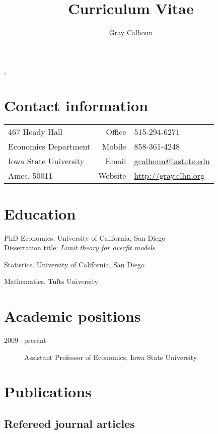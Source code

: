 \documentclass[12pt]{article}%
\author{Gray Calhoun}
\title{Curriculum Vitae}
\makeatletter
\newcommand{\allcaps}[1]{\textls{\MakeUppercase{#1}}}
\def\maketitle{%
\begin{center}%
\par{\textls{\MakeUppercase{\textbf{\@author}}}}%
\vspace{\itemsep}%
\par{\@title, \@date}%
\end{center}%
}
\makeatother
\begin{document}
\maketitle

\section*{Contact information}
\begin{tabular}{@{}lrl@{}}
 467 Heady Hall            & Office  & 515-294-6271              \\
 Economics Department      & Mobile  & 858-361-4248              \\
 Iowa State University     & Email   & \url{gcalhoun@iastate.edu}\\
 Ames, \allcaps{IA} 50011  & Website & \url{http://gray.clhn.org}
\end{tabular}

\section*{Education}

\begin{description}[noitemsep]
\item[2009] PhD Economics. University of California, San Diego \\
Dissertation title: \textit{Limit theory for overfit models}
\item[2006] \allcaps{MS} Statistics. University of California, San Diego
\item[2001] \allcaps{BA} Mathematics. Tufts University
\end{description}

\section*{Academic positions}

\begin{description}
\item[2009\,--\,present] Assistant Professor of Economics, Iowa State University
\end{description}

\section*{Publications}
\subsection*{Refereed journal articles}
\end{document}
